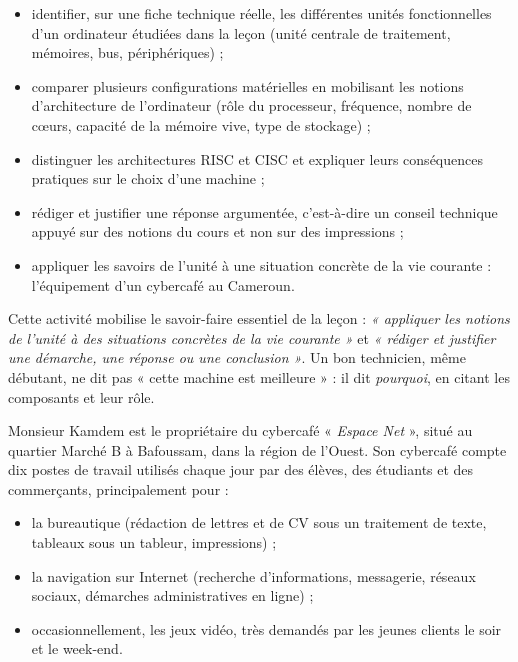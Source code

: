 \documentclass[11pt]{article}
\newcommand{\cle}[1]{{\popxbold\color{popdark}#1}}
\newcounter{popsec}
\newcounter{popsub}
\newcommand{\courssub}[1]{%
  \stepcounter{popsub}%
  \par\vspace{9pt}\noindent{\popxbold\fontsize{11.5}{13}\selectfont\color{popink}{\color{poporange}\thepopsec.\thepopsub}\hspace{6pt}#1}\par\nopagebreak\vspace{4pt}
}
\begin{document}
\begin{itemize}
\item \cle{identifier}, sur une fiche technique réelle, les différentes unités fonctionnelles d'un ordinateur étudiées dans la leçon (unité centrale de traitement, mémoires, bus, périphériques) ;
\item \cle{comparer} plusieurs configurations matérielles en mobilisant les notions d'architecture de l'ordinateur (rôle du processeur, fréquence, nombre de cœurs, capacité de la mémoire vive, type de stockage) ;
\item \cle{distinguer} les architectures \cle{RISC} et \cle{CISC} et expliquer leurs conséquences pratiques sur le choix d'une machine ;
\item \cle{rédiger et justifier} une réponse argumentée, c'est-à-dire un conseil technique appuyé sur des notions du cours et non sur des impressions ;
\item \cle{appliquer} les savoirs de l'unité à une situation concrète de la vie courante : l'équipement d'un cybercafé au Cameroun.
\end{itemize}

\begin{aretenir}
Cette activité mobilise le savoir-faire essentiel de la leçon : \emph{« appliquer les notions de l'unité à des situations concrètes de la vie courante »} et \emph{« rédiger et justifier une démarche, une réponse ou une conclusion »}. Un bon technicien, même débutant, ne dit pas « cette machine est meilleure » : il dit \emph{pourquoi}, en citant les composants et leur rôle.
\end{aretenir}

\courssub{Situation}

Monsieur Kamdem est le propriétaire du cybercafé « \emph{Espace Net} », situé au quartier Marché B à Bafoussam, dans la région de l'Ouest. Son cybercafé compte dix postes de travail utilisés chaque jour par des élèves, des étudiants et des commerçants, principalement pour :

\begin{itemize}
\item la bureautique (rédaction de lettres et de CV sous un traitement de texte, tableaux sous un tableur, impressions) ;
\item la navigation sur Internet (recherche d'informations, messagerie, réseaux sociaux, démarches administratives en ligne) ;
\item occasionnellement, les jeux vidéo, très demandés par les jeunes clients le soir et le week-end.
\end{itemize}
\end{document}
